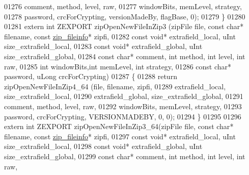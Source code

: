 \begin{DoxyCode}
01276                                  comment, method, level, raw,
01277                                  windowBits, memLevel, strategy,
01278                                  password, crcForCrypting, versionMadeBy, flagBase, 0);
01279 \}
01280 
01281 \textcolor{keyword}{extern} \textcolor{keywordtype}{int} ZEXPORT zipOpenNewFileInZip3 (zipFile file, \textcolor{keyword}{const} \textcolor{keywordtype}{char}* filename, \textcolor{keyword}{const} 
      \hyperlink{structzip__fileinfo}{zip\_fileinfo}* zipfi,
01282                                          \textcolor{keyword}{const} \textcolor{keywordtype}{void}* extrafield\_local, uInt size\_extrafield\_local,
01283                                          \textcolor{keyword}{const} \textcolor{keywordtype}{void}* extrafield\_global, uInt size\_extrafield\_global,
01284                                          \textcolor{keyword}{const} \textcolor{keywordtype}{char}* comment, \textcolor{keywordtype}{int} method, \textcolor{keywordtype}{int} level, \textcolor{keywordtype}{int} raw,
01285                                          \textcolor{keywordtype}{int} windowBits,\textcolor{keywordtype}{int} memLevel, \textcolor{keywordtype}{int} strategy,
01286                                          \textcolor{keyword}{const} \textcolor{keywordtype}{char}* password, uLong crcForCrypting)
01287 \{
01288     \textcolor{keywordflow}{return} zipOpenNewFileInZip4\_64 (file, filename, zipfi,
01289                                  extrafield\_local, size\_extrafield\_local,
01290                                  extrafield\_global, size\_extrafield\_global,
01291                                  comment, method, level, raw,
01292                                  windowBits, memLevel, strategy,
01293                                  password, crcForCrypting, VERSIONMADEBY, 0, 0);
01294 \}
01295 
01296 \textcolor{keyword}{extern} \textcolor{keywordtype}{int} ZEXPORT zipOpenNewFileInZip3\_64(zipFile file, \textcolor{keyword}{const} \textcolor{keywordtype}{char}* filename, \textcolor{keyword}{const} 
      \hyperlink{structzip__fileinfo}{zip\_fileinfo}* zipfi,
01297                                          \textcolor{keyword}{const} \textcolor{keywordtype}{void}* extrafield\_local, uInt size\_extrafield\_local,
01298                                          \textcolor{keyword}{const} \textcolor{keywordtype}{void}* extrafield\_global, uInt size\_extrafield\_global,
01299                                          \textcolor{keyword}{const} \textcolor{keywordtype}{char}* comment, \textcolor{keywordtype}{int} method, \textcolor{keywordtype}{int} level, \textcolor{keywordtype}{int} raw,

\end{DoxyCode}
